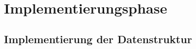 \newpage
\section{Implementierungsphase}
\label{implementierungsphase}
\begin{comment}
	In Implementierung verlagern
	
	Beim Speichern wird über mehrere anliegende Systeme ein Angebot in einer Datenbank gespeichert. Wichtig ist dabei die Session, welche von einem der Systeme generiert wird, realisiert als \ac{GUID}. Mithilfe dieser wird ein Angebot im XML-Format in einer Datenbank gespeichert und ist dadurch eindeutig identifizierbar.\\
	
	Dies beinhaltet die gleiche Logik wie die Angebotsspeicherung, bis auf dass eine neue \ac{GUID} erzeugt wird, wodurch dementsprechend ein neuer Eintrag in der Datenbank und im Maklerportal hinterlegt wird. Außerdem muss mit der \ac{GUID}, bzw. Session der Kopie weitergearbeitet werden.\\
\end{comment} 

\subsection{Implementierung der Datenstruktur}
\label{datenstruktur}

